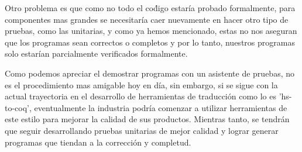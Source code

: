 Otro problema es que como no todo el co\'digo estaría probado formalmente, para componentes mas grandes se necesitaría caer 
nuevamente en hacer otro tipo de pruebas, como las unitarias, y como ya hemos mencionado, estas no nos aseguran que los 
programas sean correctos o completos y por lo tanto, nuestros programas solo estarían parcialmente verificados formalmente.

Como podemos apreciar el demostrar programas con un asistente de pruebas, no es el procedimiento mas amigable hoy en día, 
sin embargo, si se sigue con la actual trayectoria en el desarrollo de herramientas de traducci\'on como lo es 'hs-to-coq', eventualmente la industria podría comenzar a utilizar herramientas de este estilo para mejorar la calidad de sus productos. Mientras tanto, se tendrán que seguir desarrollando pruebas unitarias de mejor calidad y lograr generar programas que tiendan a la correcci\'on y completud.
